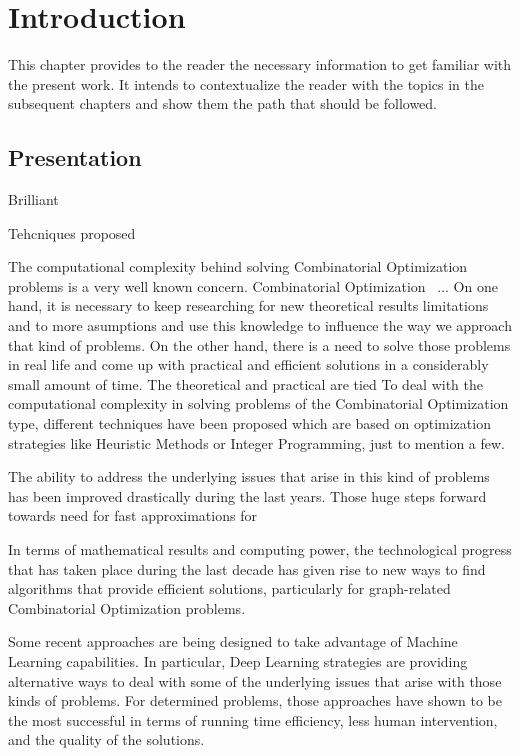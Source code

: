 %
%
\let\textcircled=\pgftextcircled
\chapter{Introduction}
\label{Chapter1}

This chapter provides to the reader the necessary information to get familiar with the present work. It intends to contextualize the reader with the topics in the subsequent chapters and show them the path that should be followed.

\section{Presentation}

Brilliant~\cite{brilliant}

Tehcniques proposed~\cite{fernandes}

The computational complexity behind solving Combinatorial Optimization problems is a very well known concern. 
Combinatorial Optimization ~\cite{appcombinatorial}... On one hand, it is necessary to keep researching for new theoretical results limitations and to more asumptions and use this knowledge to influence the way we approach that kind of problems. On the other hand, there is a need to solve those problems in real life and come up with practical and efficient solutions in a considerably small amount of time. The theoretical and practical are tied
To deal with the computational complexity in solving problems of the Combinatorial Optimization type, different techniques have been proposed which are based on optimization strategies like Heuristic Methods or Integer Programming, just to mention a few.

The ability to address the underlying issues that arise in this kind of problems has been improved drastically during the last years. Those huge steps forward towards need for fast approximations for 

In terms of mathematical results and computing power, the technological progress that has taken place during the last decade has given rise to new ways to find algorithms that provide efficient solutions, particularly for graph-related Combinatorial Optimization problems.

Some recent approaches are being designed to take advantage of Machine Learning capabilities. In particular, Deep Learning strategies are providing alternative ways to deal with some of the underlying issues that arise with those kinds of problems. For determined problems, those approaches have shown to be the most successful in terms of running time efficiency, less human intervention, and the quality of the solutions. \\

